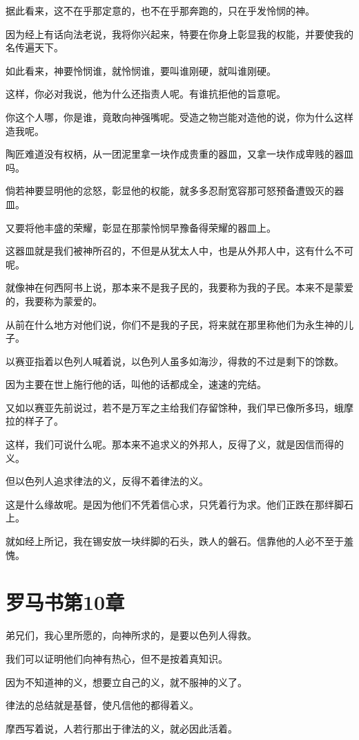 \documentclass[12pt,oneside]{book}
\begin{document}
据此看来，这不在乎那定意的，也不在乎那奔跑的，只在乎发怜悯的神。

因为经上有话向法老说，我将你兴起来，特要在你身上彰显我的权能，并要使我的名传遍天下。

如此看来，神要怜悯谁，就怜悯谁，要叫谁刚硬，就叫谁刚硬。

这样，你必对我说，他为什么还指责人呢。有谁抗拒他的旨意呢。

你这个人哪，你是谁，竟敢向神强嘴呢。受造之物岂能对造他的说，你为什么这样造我呢。

陶匠难道没有权柄，从一团泥里拿一块作成贵重的器皿，又拿一块作成卑贱的器皿吗。

倘若神要显明他的忿怒，彰显他的权能，就多多忍耐宽容那可怒预备遭毁灭的器皿。

又要将他丰盛的荣耀，彰显在那蒙怜悯早豫备得荣耀的器皿上。

这器皿就是我们被神所召的，不但是从犹太人中，也是从外邦人中，这有什么不可呢。

就像神在何西阿书上说，那本来不是我子民的，我要称为我的子民。本来不是蒙爱的，我要称为蒙爱的。

从前在什么地方对他们说，你们不是我的子民，将来就在那里称他们为永生神的儿子。

以赛亚指着以色列人喊着说，以色列人虽多如海沙，得救的不过是剩下的馀数。

因为主要在世上施行他的话，叫他的话都成全，速速的完结。

又如以赛亚先前说过，若不是万军之主给我们存留馀种，我们早已像所多玛，蛾摩拉的样子了。

这样，我们可说什么呢。那本来不追求义的外邦人，反得了义，就是因信而得的义。

但以色列人追求律法的义，反得不着律法的义。

这是什么缘故呢。是因为他们不凭着信心求，只凭着行为求。他们正跌在那绊脚石上。

就如经上所记，我在锡安放一块绊脚的石头，跌人的磐石。信靠他的人必不至于羞愧。

\chapter{罗马书第10章}
弟兄们，我心里所愿的，向神所求的，是要以色列人得救。

我们可以证明他们向神有热心，但不是按着真知识。

因为不知道神的义，想要立自己的义，就不服神的义了。

律法的总结就是基督，使凡信他的都得着义。

摩西写着说，人若行那出于律法的义，就必因此活着。
\end{document}
